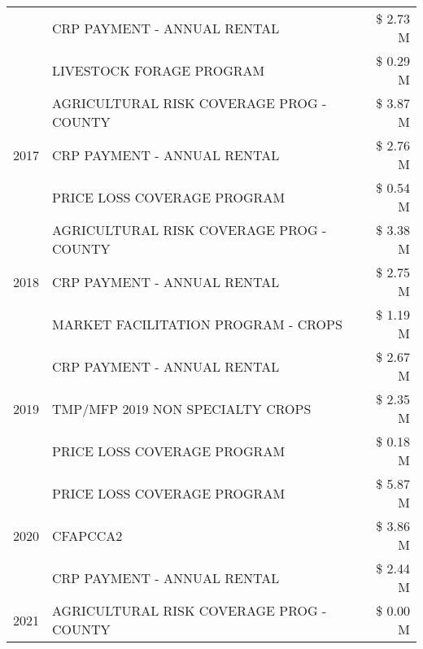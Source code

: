 \begin{tabular}{llr}
 & CRP PAYMENT - ANNUAL RENTAL & \$ 2.73 M \\
 & LIVESTOCK FORAGE PROGRAM & \$ 0.29 M \\
\cline{1-3}
\multirow[t]{3}{*}{2017} & AGRICULTURAL RISK COVERAGE PROG - COUNTY & \$ 3.87 M \\
 & CRP PAYMENT - ANNUAL RENTAL & \$ 2.76 M \\
 & PRICE LOSS COVERAGE PROGRAM & \$ 0.54 M \\
\cline{1-3}
\multirow[t]{3}{*}{2018} & AGRICULTURAL RISK COVERAGE PROG - COUNTY & \$ 3.38 M \\
 & CRP PAYMENT - ANNUAL RENTAL & \$ 2.75 M \\
 & MARKET FACILITATION PROGRAM - CROPS & \$ 1.19 M \\
\cline{1-3}
\multirow[t]{3}{*}{2019} & CRP PAYMENT - ANNUAL RENTAL & \$ 2.67 M \\
 & TMP/MFP 2019 NON SPECIALTY CROPS & \$ 2.35 M \\
 & PRICE LOSS COVERAGE PROGRAM & \$ 0.18 M \\
\cline{1-3}
\multirow[t]{3}{*}{2020} & PRICE LOSS COVERAGE PROGRAM & \$ 5.87 M \\
 & CFAPCCA2 & \$ 3.86 M \\
 & CRP PAYMENT - ANNUAL RENTAL & \$ 2.44 M \\
\cline{1-3}
2021 & AGRICULTURAL RISK COVERAGE PROG - COUNTY & \$ 0.00 M \\
\cline{1-3}
\bottomrule
\end{tabular}
